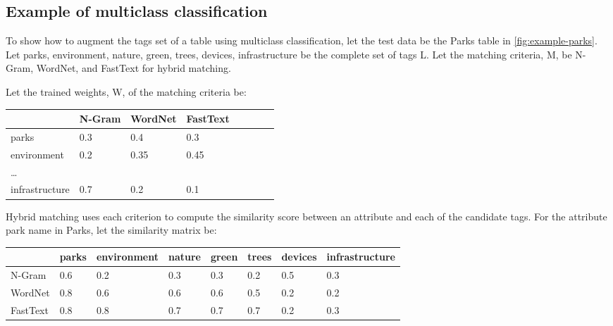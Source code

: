 \subsection{Example of multiclass classification}

To show how to augment the tags set of a table using multiclass classification, let the test data be the Parks table in \autoref{fig:example-parks}. Let {parks, environment, nature, green, trees, devices, infrastructure} be the complete set of tags L. Let the matching criteria, M, be {N-Gram, WordNet, and FastText} for hybrid matching.

Let the trained weights, W, of the matching criteria be:

\begin{table}[h!]
    \begin{center}
      \begin{tabular}{|l|l|l|l|l|l|l|l|}
        \hline        
        & \textbf{N-Gram} & \textbf{WordNet} & \textbf{FastText}\\
        \hline
        parks & 0.3 & 0.4 & 0.3 \\
        \hline
        environment & 0.2 & 0.35 & 0.45 \\
        \hline
        \dots &  &  &  \\
        \hline
        infrastructure & 0.7 & 0.2 & 0.1 \\
        \hline    
      \end{tabular}
    \end{center}
\end{table}

Hybrid matching uses each criterion to compute the similarity score between an attribute and each of the candidate tags. For the attribute park name in Parks, let the similarity matrix be:

\begin{table}[h!]
    \begin{center}
      \begin{tabular}{|l|l|l|l|l|l|l|l|}
        \hline
        & \textbf{parks} & \textbf{environment} & \textbf{nature} & \textbf{green} & \textbf{trees} & \textbf{devices} & \textbf{infrastructure}\\
        \hline
        N-Gram & 0.6 & 0.2 & 0.3 & 0.3 & 0.2 & 0.5 & 0.3 \\
        \hline
        WordNet & 0.8 & 0.6 & 0.6 & 0.6 & 0.5 & 0.2 & 0.2 \\
        \hline
        FastText & 0.8 & 0.8 & 0.7 & 0.7 & 0.7 & 0.2 & 0.3 \\
        \hline    
      \end{tabular}
    \end{center}
\end{table}

